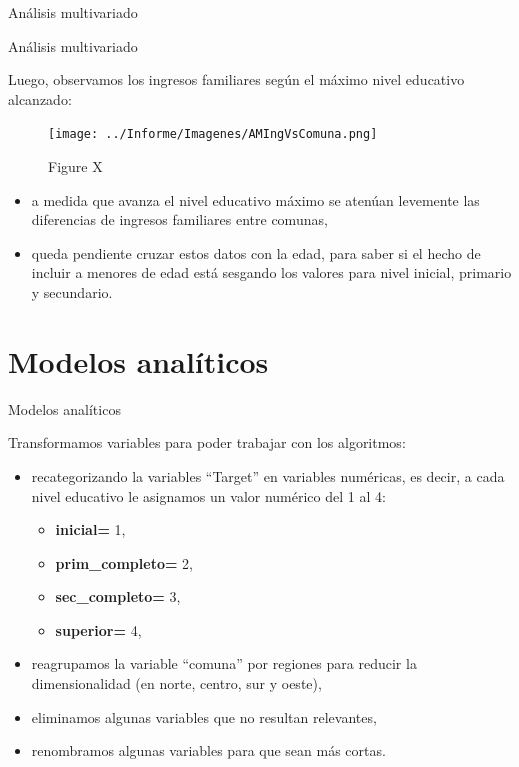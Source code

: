 \documentclass[pdf]{beamer}
\def\vspace{}%
\begin{document}
{\begin{frame}{Análisis multivariado}
\end{frame}

\begin{frame}{Análisis multivariado}

    Luego, observamos los ingresos familiares según el máximo nivel educativo alcanzado:

    \begin{minipage}{0.55\textwidth}
        \begin{figure} 
        \texttt{[image: ../Informe/Imagenes/AMIngVsComuna.png]}
        \caption{Figure X}
        \end{figure}
    \end{minipage}
    \begin{minipage}{0.38\textwidth}
        \begin{itemize}
            \justifying%
            \item a medida que avanza el nivel educativo máximo se atenúan levemente las diferencias de ingresos familiares entre comunas,
            \item queda pendiente cruzar estos datos con la edad, para saber si el hecho de incluir a menores de edad está sesgando los valores para nivel inicial, primario y secundario.
        \end{itemize}
    \end{minipage}

\end{frame}

\section{Modelos analíticos}

\begin{frame}{Modelos analíticos}

    Transformamos variables para poder trabajar con los algoritmos:
    \begin{itemize}
        \item recategorizando la variables ``Target'' en variables numéricas, es decir, a cada nivel educativo le asignamos un valor numérico del 1 al 4:
        \begin{itemize}
            \item \textbf{inicial=} 1,
            \item \textbf{prim\_completo=} 2,
            \item \textbf{sec\_completo=} 3,
            \item \textbf{superior=} 4,
        \end{itemize}
        \item reagrupamos la variable ``comuna'' por regiones para reducir la dimensionalidad (en norte, centro, sur y oeste),
        \item eliminamos algunas variables que no resultan relevantes, 
        \item renombramos algunas variables para que sean más cortas.
    \end{itemize}
    

\end{frame}}
\end{document}
